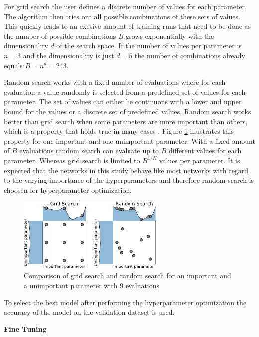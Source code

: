 \documentclass[conference]{IEEEtran}
\begin{document}
For grid search the user defines a discrete number of values for each parameter. The algorithm then tries out all possible combinations of these sets of values. This quickly leads to an exesive amount of training runs that need to be done as the number of possible combinations $ B $ grows exponentially with the dimensionality $ d $ of the search space. If the number of values per parameter is $ n = 3 $ and the dimensionality is just $ d = 5 $ the number of combinations already equals $ B = n^d = 243 $.

Random search works with a fixed number of evaluations where for each evaluation a value randomly is selected from a predefined set of values for each parameter. The set of values can either be continuous with a lower and upper bound for the values or a discrete set of predefined values. Random search works better than grid search when some parameters are more important than others, which is a property that holds true in many cases \cite{Feurer2019}. Figure \ref{fig:grid_search_random_search} illustrates this property for one important and one unimportant parameter. With a fixed amount of $ B $ evaluations random search can evaluate up to $ B $ different values for each parameter. Whereas grid search is limited to $ B^{1/N} $ values per parameter. It is expected that the networks in this study behave like most networks with regard to the varying importance of the hyperparameters and therefore random search is choosen for hyperparameter optimization.

\begin{figure}[htp]
	\centering
	\includegraphics[width=7cm]{grid_search_random_search.pdf}
	\caption{Comparison of grid search and random search for an important and a unimportant parameter with 9 evaluations \cite{Feurer2019}}
	\label{fig:grid_search_random_search}
\end{figure}

To select the best model after performing the hyperparameter optimization the accuracy of the model on the validation dataset is used.

\noindent
\textbf{Fine Tuning}
\end{document}
